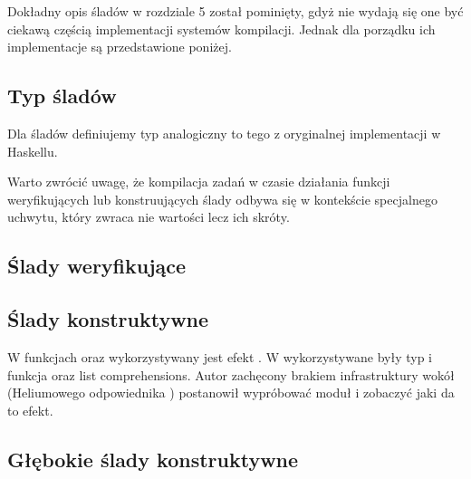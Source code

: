 Dokładny opis śladów w rozdziale 5 został pominięty, gdyż nie wydają się one być ciekawą częścią implementacji systemów kompilacji. Jednak dla porządku ich implementacje są przedstawione poniżej.

\subsection{Typ śladów}

Dla śladów definiujemy typ analogiczny to tego z oryginalnej implementacji w Haskellu.

\begin{minipage}{\textwidth}
  
\end{minipage}

Warto zwrócić uwagę, że kompilacja zadań w czasie działania funkcji weryfikujących lub konstruujących ślady odbywa się w kontekście specjalnego uchwytu, który zwraca nie wartości lecz ich skróty.

\subsection{Ślady weryfikujące}

\begin{minipage}{\textwidth}
  
\end{minipage}

\subsection{Ślady konstruktywne}

\begin{minipage}{\textwidth}
  
\end{minipage}

W funkcjach  oraz  wykorzystywany jest efekt . W \BSaLC{} wykorzystywane były typ  i funkcja  oraz list comprehensions. Autor zachęcony brakiem infrastruktury wokół  (Heliumowego odpowiednika ) postanowił wypróbować moduł  i zobaczyć jaki da to efekt.

\subsection{Głębokie ślady konstruktywne}

\begin{minipage}{\textwidth}
  
\end{minipage}
